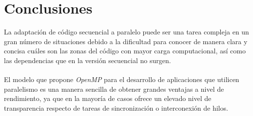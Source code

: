 \documentclass[10pt, a4paper,spanish]{article}
\begin{document}
	\section{Conclusiones}

		\paragraph{}
		La adaptación de código secuencial a paralelo puede ser una tarea compleja en un gran número de situaciones debido a la dificultad para conocer de manera clara y concisa cuáles son las zonas del código con mayor carga computacional, así como las dependencias que en la versión secuencial no surgen.

		\paragraph{}
		El modelo que propone \emph{OpenMP}\cite{tool:openmp} para el desarrollo de aplicaciones que utilicen paralelismo es una manera sencilla de obtener grandes ventajas a nivel de rendimiento, ya que en la mayoría de casos ofrece un elevado nivel de transparencia respecto de tareas de sincronización o interconexión de hilos.

	\nocite{subject:cp}
  
  
\end{document}
